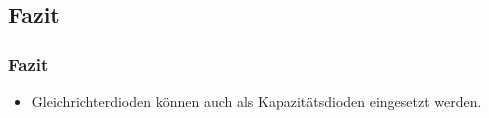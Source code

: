 \subsection{Fazit}
\begin{frame}
\frametitle{Fazit}
  \begin{itemize}
    \item Gleichrichterdioden können auch als Kapazitätsdioden eingesetzt 
    werden. 
  \end{itemize}
\end{frame}
